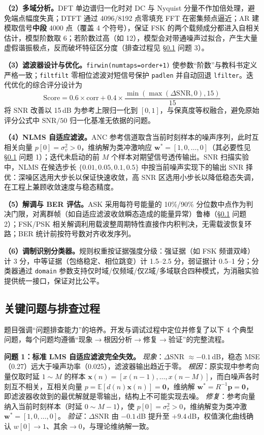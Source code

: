 \documentclass[12pt, a4paper, UTF8]{ctexart}
\begin{document}
\textbf{（2）多域分析。}DFT 单边谱归一化时对 DC 与 Nyquist 分量不作加倍处理，避免端点幅度失真；DTFT 通过 4096/8192 点零填充 FFT 在密集频点逼近；AR 建模取信号\textbf{中段} 4000 点（覆盖 4 个符号），保证 FSK 的两个载频成分都进入自相关估计，模型阶数取 6；若阶数过高（如 12），模型会对带通噪声过拟合，产生大量虚假谐振极点，反而破坏特征区分度（排查过程见 \S\ref{sec:debug} 问题 3）。

\textbf{（3）滤波器设计与优化。}\texttt{firwin(numtaps=order+1)} 使参数``阶数''与教科书定义严格一致；\texttt{filtfilt} 零相位滤波对短信号保护 \texttt{padlen} 并自动回退 \texttt{lfilter}。迭代优化的综合评分设计为
\begin{equation}
\mathrm{Score} = 0.6\times\mathrm{corr} + 0.4\times\frac{\min(\max(\Delta\mathrm{SNR},0),15)}{15}
\end{equation}
将 SNR 改善以 15\,dB 为参考上限归一化到 $[0,1]$，与保真度等权融合，避免原始评分公式中 $ \mathrm{SNR}/50 $ 归一化基准无依据的问题。

\textbf{（4）NLMS 自适应滤波。}ANC 参考信道取含当前时刻样本的噪声序列，此时互相关向量 $p[0]=\sigma_v^2>0$，维纳解为类冲激响应 $\bm{w}^\ast=[1,0,\dots,0]$（其必要性见 \S\ref{sec:debug} 问题 1）；迭代未启动的前 $M$ 个样本对期望信号透传输出。SNR 扫描实验中，NLMS 在候选步长 $\{0.01,0.05,0.1,0.5\}$ 中按当前噪声实现下的输出 SNR 择优：深噪区选用大步长以保证快速收敛，高 SNR 区选用小步长以降低稳态失调，在工程上兼顾收敛速度与稳态精度。

\textbf{（5）解调与 BER 评估。}ASK 采用每符号能量的 10\%/90\% 分位数中点作为判决门限，对离群帧（如自适应滤波收敛瞬态造成的能量异常）鲁棒（\S\ref{sec:debug} 问题 2）；FSK/PSK 相关解调利用载波整周期特性直接作内积判决，无需载波恢复环路；BER 统计前按符号数对齐收发序列。

\textbf{（6）调制识别分类器。}规则权重按证据强度分级：强证据（如 FSK 频谱双峰）计 3 分，中等证据（包络稳定、相位跳变）计 1.5--2.5 分，弱证据计 0.5--1 分；分类器通过 \texttt{domain} 参数支持仅时域/仅频域/仅Z域/多域联合四种模式，为消融实验提供统一接口，保证对比公平。

\subsection{关键问题与排查过程}
\label{sec:debug}

题目强调``问题排查能力''的培养。开发与调试过程中定位并修复了以下 4 个典型问题，每个问题均遵循``现象$\to$根因分析$\to$修复$\to$验证''的完整流程。

\textbf{问题 1：标准 LMS 自适应滤波完全失效。}
\textit{现象}：$\Delta$SNR $\approx -0.1$\,dB，稳态 MSE（0.27）远大于噪声功率（0.025），滤波器输出趋近于零。
\textit{根因}：原实现中参考向量仅取时延 $1\sim M$ 的样本 $\bm{x}(n)=[x(n-1),\dots,x(n-M)]$，而白噪声各时刻互不相关，互相关向量 $p=\mathbb{E}[d(n)\bm{x}(n)]=\bm{0}$，维纳解 $\bm{w}^\ast=R^{-1}\bm{p}=\bm{0}$，即滤波器收敛到的最优解就是零输出，结构上不可能实现去噪。
\textit{修复}：参考向量纳入当前时刻样本（时延 $0\sim M{-}1$），使 $p[0]=\sigma_v^2>0$，维纳解变为类冲激 $\bm{w}^\ast=[1,0,\dots,0]$。
\textit{验证}：$\Delta$SNR 由 $-0.1$\,dB 提升至 $+9.4$\,dB，权值演化曲线确认 $w[0]\to 1$、其余$\to 0$，与理论维纳解一致。
\end{document}
